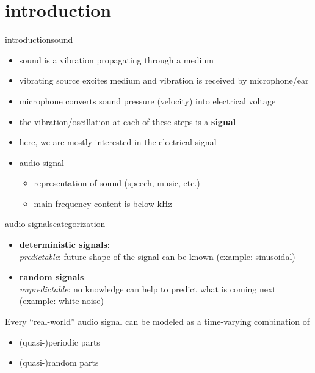 


\subtitle{Part 3: Signals}


	

\section{introduction}
\begin{frame}{introduction}{sound}
    \begin{itemize}
        \item   sound is a vibration propagating through a medium
        \item   vibrating source excites medium and vibration is received by microphone/ear
        \item   microphone converts sound pressure (velocity) into electrical voltage
        
        \bigskip
        \item<2-> the vibration/oscillation at each of these steps is a \textbf{signal}
        \item<2-> here, we are mostly interested in the electrical signal
        
        \bigskip
        \item<3-> audio signal
            \begin{itemize}
                \item   representation of sound (speech, music, etc.)
                \item   main frequency content is below \unit[12]{kHz}
            \end{itemize}
    \end{itemize}
\end{frame}

\begin{frame}{audio signals}{categorization}
	\begin{itemize}
		\item	\textbf{deterministic signals}:\\
				\textit{predictable}: future shape of the signal can be known (example: sinusoidal)
		\pause		
		\item	\textbf{random signals}:\\
				\textit{unpredictable}: no knowledge can help to predict what is coming next (example: white noise)
	\end{itemize}
    
    \pause
    \bigskip
	
	Every ``real-world'' audio signal can be modeled as a time-varying combination of 
	\begin{itemize}
		\item	(quasi-)periodic parts
		\item	(quasi-)random parts
	\end{itemize}
\end{frame}

